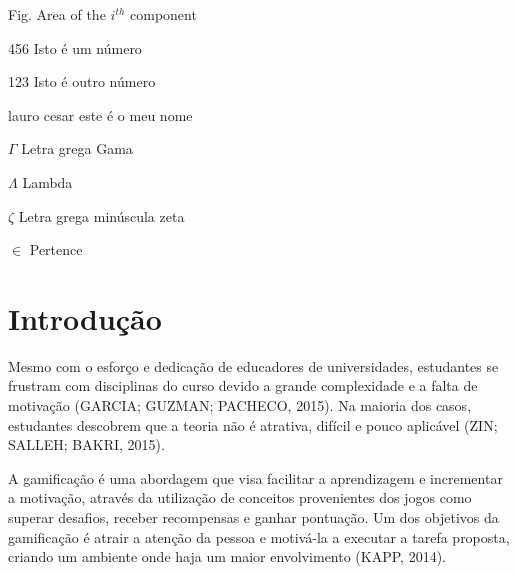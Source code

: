 \documentclass[
	12pt,				%
	oneside,			%
	a4paper,			%
	english,			%
	french,				%
	spanish,			%
	brazil,				%
	]{abntex2}
\begin{document}

\listoffigures*
\cleardoublepage

\listoftables*
\cleardoublepage

\begin{siglas}
  \item[Fig.] Area of the $i^{th}$ component
  \item[456] Isto é um número
  \item[123] Isto é outro número
  \item[lauro cesar] este é o meu nome
\end{siglas}

\begin{simbolos}
  \item[$ \Gamma $] Letra grega Gama
  \item[$ \Lambda $] Lambda
  \item[$ \zeta $] Letra grega minúscula zeta
  \item[$ \in $] Pertence
\end{simbolos}

\tableofcontents*
\cleardoublepage



\textual

\chapter{Introdução}

Mesmo com o esforço e dedicação de educadores de universidades, estudantes se frustram com disciplinas do curso devido a grande complexidade e a falta de motivação (GARCIA; GUZMAN; PACHECO, 2015). Na maioria dos casos, estudantes descobrem que a teoria não é atrativa, difícil e pouco aplicável (ZIN; SALLEH; BAKRI, 2015).

A gamificação é uma abordagem que visa facilitar a aprendizagem e incrementar a motivação, através da utilização de conceitos provenientes dos jogos como superar desafios, receber recompensas e ganhar pontuação. Um dos objetivos da gamificação é atrair a atenção da pessoa e motivá-la a executar a tarefa proposta, criando um ambiente onde haja um maior envolvimento (KAPP, 2014). 	
\end{document}
